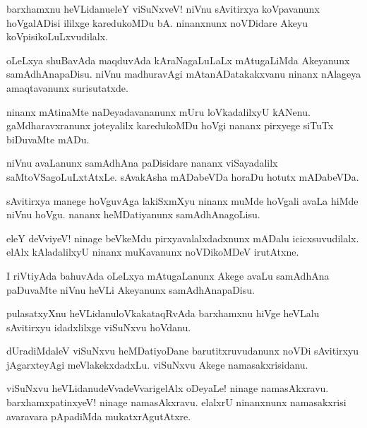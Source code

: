 \begin{mng}
barxhamxnu heVLidanu\mdash eleY viSuNxveV! niVnu sAvitirxya koVpavanunx hoVgalADisi ililxge karedukoMDu bA. ninanxnunx noVDidare Akeyu koVpisikoLuLxvudilalx.
\end{mng}

\begin{mng}
oLeLxya shuBavAda maqduvAda kAraNagaLuLaLx mAtugaLiMda Akeyanunx samAdhAnapaDisu. niVnu madhuravAgi mAtanADatakakxvanu ninanx nAlageya amaqtavanunx surisutatxde.
\end{mng}

\begin{mng}
ninanx mAtinaMte naDeyadavananunx mUru loVkadalilxyU kANenu. gaMdharavxranunx joteyalilx karedukoMDu hoVgi nananx pirxyege siTuTx biDuvaMte mADu.
\end{mng}

\begin{mng}
niVnu avaLanunx samAdhAna paDisidare nananx viSayadalilx saMtoVSagoLuLxtAtxLe. sAvakAsha mADabeVDa horaDu hotutx mADabeVDa.
\end{mng}

\begin{mng}
sAvitirxya manege hoVguvAga lakiSxmXyu ninanx muMde hoVgali avaLa hiMde niVnu hoVgu. nananx heMDatiyanunx samAdhAnagoLisu.
\end{mng}

\begin{mng}
eleY deVviyeV! ninage beVkeMdu pirxyavalalxdadxnunx mADalu icicxsuvudilalx. elAlx kAladalilxyU ninanx muKavanunx noVDikoMDeV irutAtxne.
\end{mng}

\begin{mng}
I riVtiyAda bahuvAda oLeLxya mAtugaLanunx Akege avaLu samAdhAna paDuvaMte niVnu heVLi Akeyanunx samAdhAnapaDisu.
\end{mng}

\begin{mng}
pulasatxyXnu heVLidanu\mdash loVkakataqRvAda barxhamxnu hiVge heVLalu sAvitirxyu idadxlilxge viSuNxvu hoVdanu.
\end{mng}

\begin{mng}
dUradiMdaleV viSuNxvu heMDatiyoDane barutitxruvudanunx noVDi sAvitirxyu jAgarxteyAgi meVlakekxdadxLu. viSuNxvu Akege namasakxrisidanu.
\end{mng}

\begin{mng}
viSuNxvu heVLidanu\mdash deVvadeVvarigelAlx oDeyaLe! ninage namasAkxravu. barxhamxpatinxyeV! ninage namasAkxravu. elalxrU ninanxnunx namasakxrisi avaravara pApadiMda mukatxrAgutAtxre.
\end{mng}

